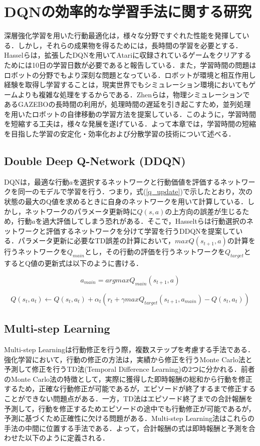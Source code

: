 \documentclass[12pt]{sonota/aislab}
\begin{document}
\section{DQNの効率的な学習手法に関する研究}\label{DQNの問題}
深層強化学習を用いた行動最適化は，様々な分野ですぐれた性能を発揮している．しかし，それらの成果物を得るためには，長時間の学習を必要とする．Hasselらは，拡張したDQNを用いてAtariに収録されているゲームをクリアするためには10日の学習日数が必要であると報告している\cite{rainbow}．また，学習時間の問題はロボットの分野でもより深刻な問題となっている．ロボットが環境と相互作用し経験を取得し学習することは，現実世界でもシミュレーション環境においてもゲームよりも複雑な処理をするからである．Zhenらは，物理シミュレーションであるGAZEBO\cite{GAZEBO}の長時間の利用が，処理時間の遅延を引き起こすため，並列処理を用いたロボットの自律移動の学習方法を提案している\cite{pararell}．このように，学習時間を短縮する工夫は，様々な発展を遂げている．よって本章では，学習時間の短縮を目指した学習の安定化・効率化および分散学習の技術について述べる．

\subsection{Double Deep Q-Network (DDQN)}
DQNは，最適な行動$a$を選択するネットワークと行動価値を評価するネットワークを同一のモデルで学習を行う．つまり，式(\ref{q_update})で示したとおり，次の状態の最大のQ値を求めるときに自身のネットワークを用いて計算している．しかし，ネットワークのパラメータ更新時に$Q(s,a)$の上方向の誤差が生じるため，行動$a$を過大評価してしまう恐れがある．そこで，Hasseltらは行動選択のネットワークと評価するネットワークを分けて学習を行うDDQNを提案している\cite{double}．パラメータ更新に必要なTD誤差の計算において，$maxQ(s_{t+1},a)$の計算を行うネットワークを$Q_{main}$とし，その行動の評価を行うネットワークを$Q_{target}$とするとQ値の更新式は以下のように書ける．

\begin{equation}
\label{a_main}
a_{main}=argmaxQ_{main}(s_{t+1},a)
\end{equation}

\begin{equation}
\label{double_q_update}
Q(s_{t},a_{t} )←Q(s_{t},a_{t} )+ α_{t} (r_{t}+ \gamma maxQ_{target}(s_{t+1},a_{main})-Q(s_{t},a_{t}))
\end{equation}

\subsection{Multi-step Learning}
Multi-step Learningは行動修正を行う際，複数ステップを考慮する手法である\cite{rl_book}．強化学習において，行動の修正の方法は，実績から修正を行うMonte Carlo法と予測して修正を行うTD法(Temporal Difference Learning)の2つに分かれる．前者のMonte Carlo法の特徴として，実際に獲得した即時報酬の総和から行動を修正するため，正確な行動修正が可能であるが，エピソードが終了するまで修正することができない問題点がある．一方，TD法はエピソード終了までの合計報酬を予測して，行動を修正するためエピソードの途中でも行動修正が可能であるが，予測に基づくため正確性に欠ける問題がある．Multi-step Learning法はこれらの手法の中間に位置する手法である．よって，合計報酬の式は即時報酬と予測を合わせた以下のように定義される．
\end{document}
